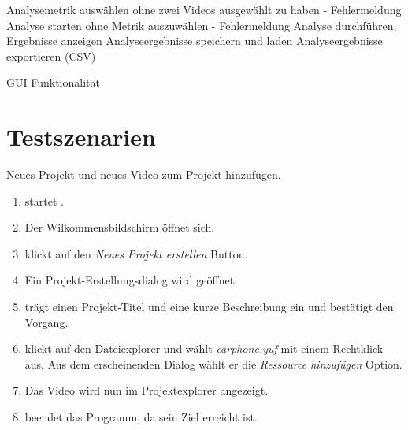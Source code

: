  Analysemetrik auswählen ohne zwei Videos ausgewählt zu haben - Fehlermeldung
 Analyse starten ohne Metrik auszuwählen - Fehlermeldung
 Analyse durchführen, Ergebnisse anzeigen
 Analyseergebnisse speichern und laden
 Analyseergebnisse exportieren (CSV)

 GUI Funktionalität




\section{Testszenarien}
\setcounter{counterKriterien}{0}


 Neues Projekt und neues Video zum Projekt hinzufügen.\\
\begin{enumerate}
\item \dAU startet \projektTitel.
\item Der Wilkommensbildschirm öffnet sich.
\item \dAU klickt auf den \emph{Neues Projekt erstellen} Button.
\item Ein Projekt-Erstellungsdialog wird geöffnet.
\item \dAU trägt einen Projekt-Titel und eine kurze Beschreibung ein und bestätigt den Vorgang.
\item \dAU klickt auf den Dateiexplorer und wählt \emph{carphone.yuf} mit einem Rechtklick aus. Aus dem erscheinenden Dialog wählt er die \emph{Ressource hinzufügen} Option.
\item Das Video wird nun im Projektexplorer angezeigt.
\item \dAU beendet das Programm, da sein Ziel erreicht ist.
\end{enumerate}


